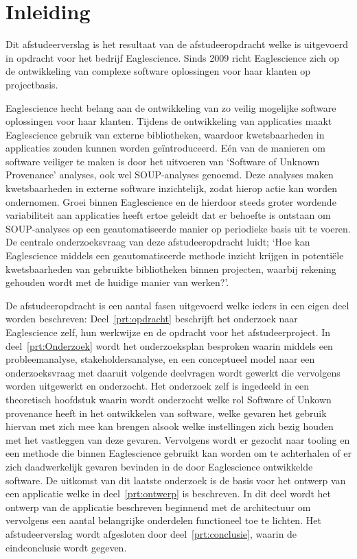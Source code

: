 \chapter{Inleiding}\label{ch:inleiding}
Dit afstudeerverslag is het resultaat van de afstudeeropdracht welke is uitgevoerd in opdracht voor het bedrijf Eaglescience. Sinds 2009 richt Eaglescience zich op de ontwikkeling van complexe software oplossingen voor haar klanten op projectbasis.

Eaglescience hecht belang aan de ontwikkeling van zo veilig mogelijke software oplossingen voor haar klanten. Tijdens de ontwikkeling van applicaties maakt Eaglescience gebruik van externe bibliotheken, waardoor kwetsbaarheden in applicaties zouden kunnen worden geïntroduceerd. Eén van de manieren om software veiliger te maken is door het uitvoeren van ‘Software of Unknown Provenance’ analyses, ook wel SOUP-analyses genoemd. Deze analyses maken kwetsbaarheden in externe software inzichtelijk, zodat hierop actie kan worden ondernomen. Groei binnen Eaglescience en de hierdoor steeds groter wordende variabiliteit aan applicaties heeft ertoe geleidt dat er behoefte is ontstaan om SOUP-analyses op een geautomatiseerde manier op periodieke basis uit te voeren. De centrale onderzoeksvraag van deze afstudeeropdracht luidt; ‘Hoe kan Eaglescience middels een geautomatiseerde methode inzicht krijgen in potentiële kwetsbaarheden van gebruikte bibliotheken binnen projecten, waarbij rekening gehouden wordt met de huidige manier van werken?’.

De afstudeeropdracht is een aantal fasen uitgevoerd welke ieders in een eigen deel worden beschreven:
Deel~\ref{prt:opdracht} beschrijft het onderzoek naar Eaglescience zelf, hun werkwijze en de opdracht voor het afstudeerproject. In deel~\ref{prt:Onderzoek} wordt het onderzoeksplan besproken waarin middels een probleemanalyse, stakeholdersanalyse, en een conceptueel model naar een onderzoeksvraag met daaruit volgende deelvragen wordt gewerkt die vervolgens worden uitgewerkt en onderzocht. Het onderzoek zelf is ingedeeld in een theoretisch hoofdstuk waarin wordt onderzocht welke rol Software of Unkown provenance heeft in het ontwikkelen van software, welke gevaren het gebruik hiervan met zich mee kan brengen alsook welke instellingen zich bezig houden met het vastleggen van deze gevaren. Vervolgens wordt er gezocht naar tooling en een methode die binnen Eaglescience gebruikt kan worden om te achterhalen of er zich daadwerkelijk gevaren bevinden in de door Eaglescience ontwikkelde software. De uitkomst van dit laatste onderzoek is de basis voor het ontwerp van een applicatie welke in deel~\ref{prt:ontwerp} is beschreven. In dit deel wordt het ontwerp van de applicatie beschreven beginnend met de architectuur om vervolgens een aantal belangrijke onderdelen functioneel toe te lichten. Het afstudeerverslag wordt afgesloten door  deel~\ref{prt:conclusie}, waarin de eindconclusie wordt gegeven.


